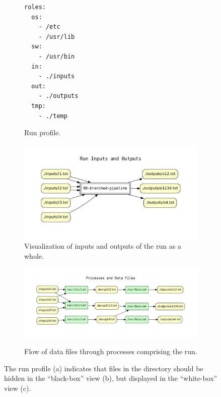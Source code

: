 \begin{figure}[th]
        \centering          
\begin{subfigure}[c]{0.18\linewidth}
\begin{verbatim}
roles:
  os:
    - /etc
    - /usr/lib
  sw:
    - /usr/bin
  in:
    - ./inputs
  out:
    - ./outputs
  tmp:
    - ./temp
\end{verbatim}
  \vspace*{-1em}
            \caption{Run profile.}
            \label{subfig-profile}
        \end{subfigure}
\hfill
        \begin{subfigure}[c]{0.69\linewidth}
          \centering
            \includegraphics[width=0.92\linewidth]{cpr_run_inputs_outputs.pdf}
            \caption{Visualization of inputs and outputs of the run as a whole.}
            \label{subfig-blackbox}
        \end{subfigure} 

\medskip

\centering 
\begin{subfigure}[b]{0.9\linewidth}
        {\includegraphics[width=1.0\linewidth]{cpr_processes_and_data_files.pdf}}
        \caption{Flow of data files through processes comprising the run.}
        \label{subfig-whitebox}
    \end{subfigure}
\caption{The run profile (a) indicates that files in the  directory should be hidden in the ``black-box'' view (b), but displayed in the ``white-box'' view (c).}
\label{fig-cpr-example}
  \vspace*{-1.5em}
\end{figure}





